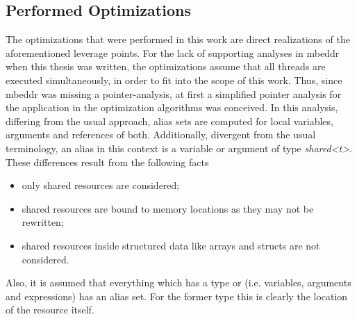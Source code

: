 \subsection{Performed Optimizations}
The optimizations that were performed in this work are direct realizations of the aforementioned leverage points. For the lack of supporting analyses in mbeddr when this thesis was written, the optimizations assume that all threads are executed simultaneously, in order to fit into the scope of this work. Thus, since mbeddr was missing a pointer-analysis, at first a simplified pointer analysis for the application in the optimization algorithms was conceived. In this analysis, differing from the usual approach, alias sets are computed for local variables, arguments and references of both. Additionally, divergent from the usual terminology, an alias in this context is a variable or argument of type \textit{shared<t>}. These differences result from the following facts
\begin{itemize}
\item only shared resources are considered;
\item shared resources are bound to memory locations as they may not be rewritten;
\item shared resources inside structured data like arrays and structs are not considered.
\end{itemize}

Also, it is assumed that everything which has a type  or  (i.e. variables, arguments and expressions) has an alias set. For the former type this is clearly the location of the resource itself.

